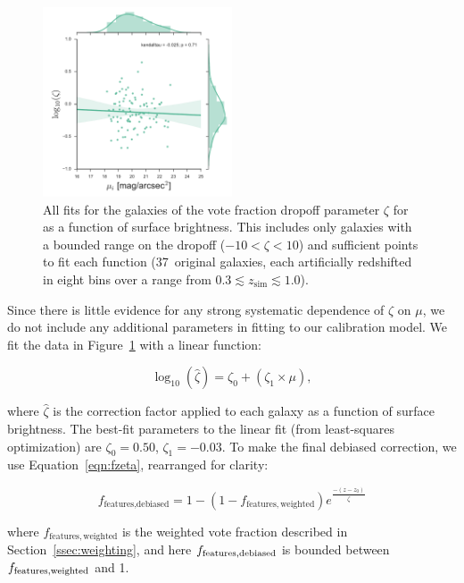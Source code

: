 \documentclass[a4paper,fleqn,usenatbib]{mnras}
\begin{document}
\begin{figure}
\center
\includegraphics[width=0.5\textwidth]{figures/zeta_mu.pdf}
\caption{All fits for the \ferengi{} galaxies of the vote fraction dropoff
parameter $\zeta$ for \ffeatures{} as a function of surface brightness. This
includes only galaxies with a bounded range on the dropoff
($-10<\zeta<10$) and sufficient points to fit each function (37~original
galaxies, each artificially redshifted in eight bins over a range from $0.3\lesssim z_\mathrm{sim}\lesssim1.0$).}
\label{fig:zeta_mu}
\end{figure}

Since there is little evidence for any strong systematic dependence of $\zeta$
on $\mu$, we do not include any additional parameters in fitting to our
calibration model.  We fit the data in Figure~\ref{fig:zeta_mu} with a linear
function:

\begin{equation}
\log_{10}(\hat\zeta) = \zeta_0 + (\zeta_1 \times \mu),
\label{eqn:zetafit}
\end{equation}

\noindent where $\hat\zeta$ is the correction factor applied to each galaxy as
a function of surface brightness. The best-fit parameters to the linear fit
(from least-squares optimization) are $\zeta_0=0.50$, $\zeta_1=-0.03$. To make the
final debiased correction, we use Equation~\ref{eqn:fzeta}, rearranged for clarity:

\begin{equation}
f_\textrm{features,debiased} = 1 - (1 - f_\mathrm{features,weighted})e^{\frac{-(z-z_0)}{\hat\zeta}}
\label{eqn:fzeta_mod}
\end{equation}

\noindent where $f_\mathrm{features,weighted}$ is the weighted vote fraction
described in Section~\ref{ssec:weighting}, and here $f_{\rm features,debiased}$ is bounded 
between $f_{\rm features,weighted}$ and 1.
\end{document}
